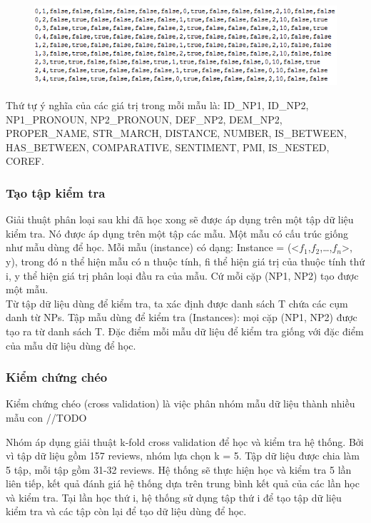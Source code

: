 \documentclass[12pt]{extarticle}
\begin{document}
				\begin{figure}[H] 
					\centering
					\includegraphics{images/examples_train.png}
				\end{figure} 
				\par Thứ tự ý nghĩa của các giá trị trong mỗi mẫu là: ID\_NP1, ID\_NP2, NP1\_PRONOUN, NP2\_PRONOUN, DEF\_NP2, DEM\_NP2, PROPER\_NAME, STR\_MARCH, DISTANCE, NUMBER, IS\_BETWEEN, HAS\_BETWEEN, COMPARATIVE, SENTIMENT, PMI, IS\_NESTED, COREF.
			\subsubsection*{Tạo tập kiểm tra}
				\par Giải thuật phân loại sau khi đã học xong sẽ được áp dụng trên một tập dữ liệu kiểm tra. Nó được áp dụng trên một tập các mẫu. Một mẫu có cấu trúc giống như mẫu dùng để học. Mỗi mẫu (instance) có dạng: Instance = (<$f_1$,$f_2$,…,$f_n$>, y), trong đó n thể hiện mẫu có n thuộc tính, fi thể hiện giá trị của thuộc tính thứ i, y thể hiện giá trị phân loại đầu ra của mẫu. Cứ mỗi cặp (NP1, NP2) tạo được một mẫu. 
				\\Từ tập dữ liệu dùng để kiểm tra, ta xác định được danh sách T chứa các cụm danh từ NPs. Tập mẫu dùng để kiểm tra (Instances): mọi cặp (NP1, NP2) được tạo ra từ danh sách T. Đặc điểm mỗi mẫu dữ liệu để kiểm tra giống với đặc điểm của mẫu dữ liệu dùng để học.
			\subsubsection*{Kiểm chứng chéo}
				\par Kiểm chứng chéo (cross validation) là việc phân nhóm mẫu dữ liệu thành nhiều mẫu con //TODO
				\par Nhóm áp dụng giải thuật k-fold cross validation để học và kiểm tra hệ thống. Bởi vì tập dữ liệu gồm 157 reviews, nhóm lựa chọn k = 5. Tập dữ liệu được chia làm 5 tập, mỗi tập gồm 31-32 reviews. Hệ thống sẽ thực hiện học và kiểm tra 5 lần liên tiếp, kết quả đánh giá hệ thống dựa trên trung bình kết quả của các lần học và kiểm tra. Tại lần học thứ i, hệ thống sử dụng tập thứ i để tạo tập dữ liệu kiểm tra và các tập còn lại để tạo dữ liệu dùng để học.
\end{document}

